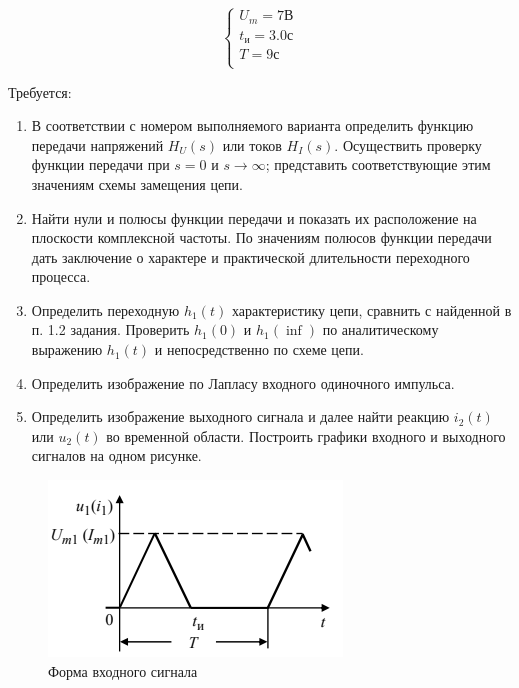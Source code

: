 \begin{enumerate}[label*=\arabic*.]
\begin{equation}\label{eq:params}
\begin{cases}
    U_m = 7 В\\
    t_и = 3.0 с\\
    T = 9 с\\
\end{cases}
\end{equation}

Требуется:

\begin{enumerate}[label*=\arabic*.]
    \item В соответствии с номером выполняемого варианта определить
    функцию передачи напряжений $ H_U(s) $ или токов $ H_I(s) $.
    Осуществить проверку функции передачи при 
    $ s = 0 $ и $ s \rightarrow \infty $; 
    представить соответствующие этим значениям схемы замещения цепи.
    \item Найти нули и полюсы функции передачи
    и показать их расположение на плоскости комплексной частоты. 
    По значениям полюсов функции передачи 
    дать заключение о характере и практической 
    длительности переходного процесса.
    \item Определить переходную $ h_1(t) $ характеристику цепи, 
    сравнить с найденной в п. 1.2 задания. 
    Проверить $ h_1(0) $ и $ h_1(\inf) $ 
    по аналитическому выражению $ h_1(t) $ и непосредственно по схеме цепи.
    \item Определить изображение по Лапласу входного одиночного импульса.
    \item Определить изображение выходного сигнала и далее
    найти реакцию $ i_2(t) $ или $ u_2(t) $ во временной области.
    Построить графики входного и выходного сигналов на одном рисунке.
\end{enumerate}

\begin{figure}[H]
    \centering
    \includegraphics[width=0.7\linewidth]{photo/task_plot}
    \caption{Форма входного сигнала}
    \label{fig:task_plot}
\end{figure}


\end{enumerate}
